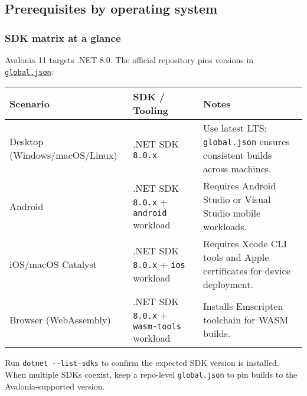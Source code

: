 \subsection{Prerequisites by operating
system}\label{prerequisites-by-operating-system}

\subsubsection{SDK matrix at a glance}\label{sdk-matrix-at-a-glance}

Avalonia 11 targets .NET 8.0. The official repository pins versions in
\href{https://github.com/AvaloniaUI/Avalonia/blob/master/global.json}{\passthrough{\lstinline!global.json!}}:

\begin{longtable}[]{@{}
  >{\raggedright\arraybackslash}p{}
  >{\raggedright\arraybackslash}p{}
  >{\raggedright\arraybackslash}p{}@{}}
\toprule\noalign{}
\begin{minipage}[b]{\linewidth}\raggedright
Scenario
\end{minipage} & \begin{minipage}[b]{\linewidth}\raggedright
SDK / Tooling
\end{minipage} & \begin{minipage}[b]{\linewidth}\raggedright
Notes
\end{minipage} \\
\midrule\noalign{}
\endhead
\bottomrule\noalign{}
\endlastfoot
Desktop (Windows/macOS/Linux) & .NET SDK \passthrough{\lstinline!8.0.x!}
& Use latest LTS; \passthrough{\lstinline!global.json!} ensures
consistent builds across machines. \\
Android & .NET SDK \passthrough{\lstinline!8.0.x!} +
\passthrough{\lstinline!android!} workload & Requires Android Studio or
Visual Studio mobile workloads. \\
iOS/macOS Catalyst & .NET SDK \passthrough{\lstinline!8.0.x!} +
\passthrough{\lstinline!ios!} workload & Requires Xcode CLI tools and
Apple certificates for device deployment. \\
Browser (WebAssembly) & .NET SDK \passthrough{\lstinline!8.0.x!} +
\passthrough{\lstinline!wasm-tools!} workload & Installs Emscripten
toolchain for WASM builds. \\
\end{longtable}

Run \passthrough{\lstinline!dotnet --list-sdks!} to confirm the expected
SDK version is installed. When multiple SDKs coexist, keep a repo-level
\passthrough{\lstinline!global.json!} to pin builds to the
Avalonia-supported version.

